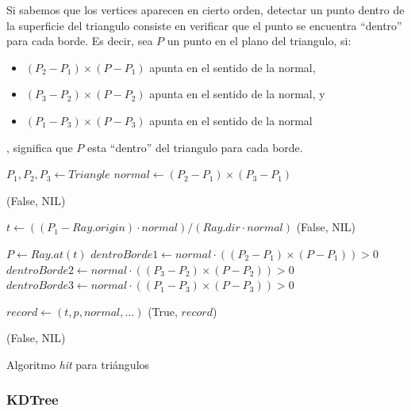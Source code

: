 
Si sabemos que los vertices aparecen en cierto orden, detectar un punto dentro de
la superficie del triangulo consiste en verificar que el punto se encuentra ``dentro''
para cada borde. Es decir, sea $P$ un punto en el plano del triangulo, si:

\begin{itemize}
    \item $(P_2 - P_1) \times (P - P_1)$ apunta en el sentido de la normal,
    \item $(P_3 - P_2) \times (P - P_2)$ apunta en el sentido de la normal, y
    \item $(P_1 - P_3) \times (P - P_3)$ apunta en el sentido de la normal
\end{itemize}

, significa que $P$ esta ``dentro'' del triangulo para cada borde.

\begin{algorithm}
\begin{algorithmic}[1]
    \State $P_1, P_2, P_3 \gets Triangle$ 
    \State $normal \gets (P_2 - P_1) \times (P_3 - P_1)$

        \State \Return (False, NIL) 
    \EndIf

    \State $t \gets ((P_1 - Ray.origin) \cdot normal) / (Ray.dir \cdot normal)$
        \State \Return (False, NIL)
    \EndIf

    \State $P \gets Ray.at(t)$ 
    \State $dentroBorde1 \gets normal \cdot ((P_2 - P_1) \times (P - P_1)) > 0$
    \State $dentroBorde2 \gets normal \cdot ((P_3 - P_2) \times (P - P_2)) > 0$
    \State $dentroBorde3 \gets normal \cdot ((P_1 - P_3) \times (P - P_3)) > 0$


        \State $record \gets (t, p, normal, \dots)$
        \State \Return (True, $record$)
    \EndIf

    \State \Return (False, NIL)
\EndFunction
\end{algorithmic}
\caption{Algoritmo \textit{hit} para triángulos}
\label{alg:triangle-hit}
\end{algorithm}

\subsubsection{KDTree}

